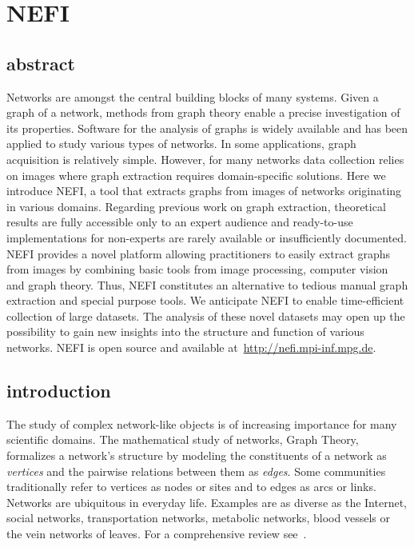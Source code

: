 \chapter{NEFI}

\section{abstract}

	Networks are amongst the central building blocks of many systems. Given a graph of a network, methods from graph theory enable a precise investigation of its properties. Software for the analysis of graphs is widely available and has been applied to study various types of networks. In some applications, graph acquisition is relatively simple. However, for many networks data collection relies on images where graph extraction requires domain-specific solutions.
	Here we introduce NEFI, a tool that extracts graphs from images of networks originating in various domains. Regarding previous work on graph extraction, theoretical results are fully accessible only to an expert audience and ready-to-use implementations for non-experts are rarely available or insufficiently documented. NEFI provides a novel platform allowing practitioners to easily extract graphs from images by combining basic tools from image processing, computer vision and graph theory. Thus, NEFI constitutes an alternative to tedious manual graph extraction and special purpose tools. We anticipate NEFI to enable time-efficient collection of large datasets. The analysis of these novel datasets may open up the possibility to gain new insights into the structure and function of various networks. NEFI is open source and available at~\href{http://nefi.mpi-inf.mpg.de}{http://nefi.mpi-inf.mpg.de}.

\section{introduction}

	The study of complex network-like objects is of increasing importance for many scientific domains. 
	The mathematical study of networks, Graph Theory, formalizes a network's structure by modeling the constituents of a network as \emph{vertices} and the pairwise relations between them as \emph{edges}. Some communities traditionally refer to vertices as nodes or sites and to edges as arcs or links. Networks are ubiquitous in everyday life. Examples are as diverse as the Internet, social networks, transportation networks, metabolic networks, blood vessels or the vein networks of leaves. For a comprehensive review see~\cite{newman2003}. 

